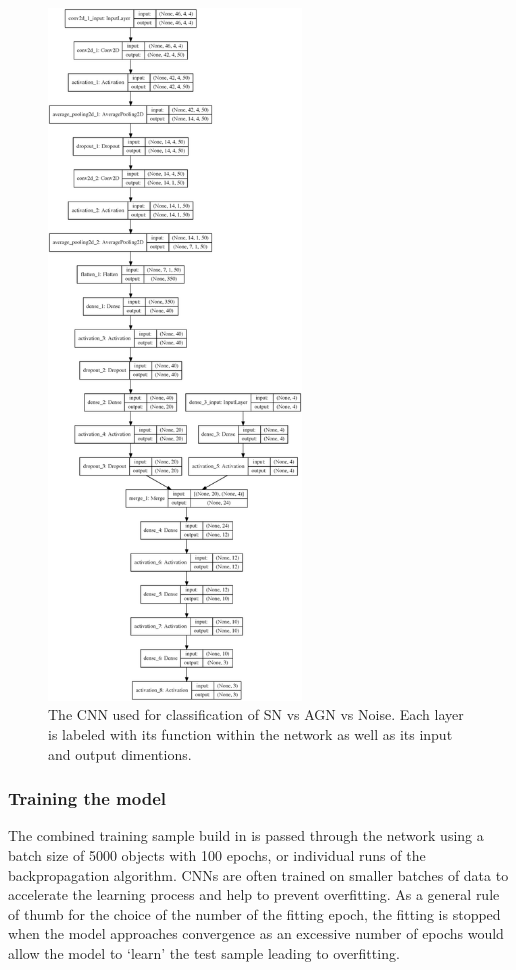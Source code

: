 \begin{figure}
  \centering
  \includegraphics[width=0.6\textwidth]{Figures/Chapter5/SNAGNNoise}
  \caption{The CNN used for classification of SN vs AGN vs Noise. Each layer is labeled with its function within the network as well as its input and output dimentions.}
  \label{fig:AGNNoiseSNModel}
\end{figure}

\subsubsection{Training the model}
The combined training sample build in  is passed through the network using a batch size of 5000 objects with 100 epochs, or individual runs of the backpropagation algorithm. CNNs are often trained on smaller batches of data to accelerate the learning process and help to prevent overfitting. As a general rule of thumb for the choice of the number of the fitting epoch, the fitting is stopped when the model approaches convergence as an excessive number of epochs would allow the model to `learn' the test sample leading to overfitting.


